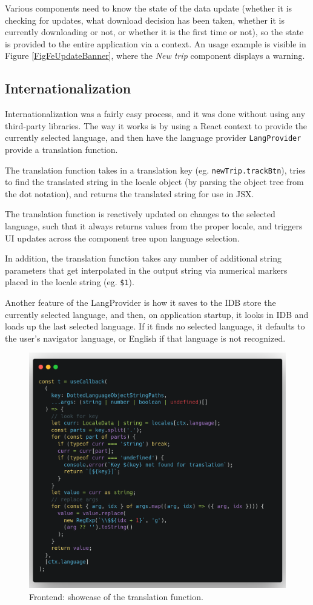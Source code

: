 Various components need to know the state of the data update (whether it is checking for updates, what download decision has been taken, whether it is currently downloading or not, or whether it is the first time or not), so the state is provided to the entire application via a context. An usage example is visible in Figure \ref{FigFeUpdateBanner}, where the \textit{New trip} component displays a warning.

\subsection{Internationalization}
Internationalization was a fairly easy process, and it was done without using any third-party libraries. The way it works is by using a React context to provide the currently selected language, and then have the language provider \verb|LangProvider| provide a translation function.

The translation function takes in a translation key (eg. \verb|newTrip.trackBtn|), tries to find the translated string in the locale object (by parsing the object tree from the dot notation), and returns the translated string for use in JSX.

The translation function is reactively updated on changes to the selected language, such that it always returns values from the proper locale, and triggers UI updates across the component tree upon language selection.

In addition, the translation function takes any number of additional string parameters that get interpolated in the output string via numerical markers placed in the locale string (eg. \verb|$1|).

Another feature of the LangProvider is how it saves to the IDB store the currently selected language, and then, on application startup, it looks in IDB and loads up the last selected language. If it finds no selected language, it defaults to the user's navigator language, or English if that language is not recognized.

\begin{figure}[htbp]
    \centering
    \includegraphics[width=.7\textwidth]{./figures/code/fe_translate-fn.png}
    \caption{Frontend: showcase of the translation function.}
    \label{FigFeTranslateFn}
\end{figure}

